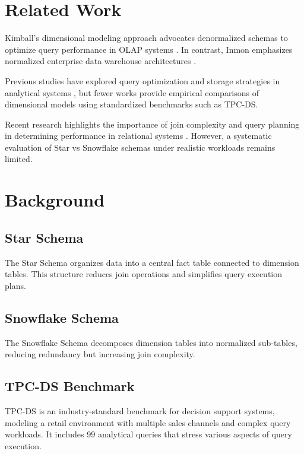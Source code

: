 \documentclass[conference]{IEEEtran}
\begin{document}
\section{Related Work}

Kimball's dimensional modeling approach advocates denormalized schemas to optimize query performance in OLAP systems \cite{kimball}. In contrast, Inmon emphasizes normalized enterprise data warehouse architectures \cite{inmon}.

Previous studies have explored query optimization and storage strategies in analytical systems \cite{abadi}, but fewer works provide empirical comparisons of dimensional models using standardized benchmarks such as TPC-DS.

Recent research highlights the importance of join complexity and query planning in determining performance in relational systems \cite{stonebraker}. However, a systematic evaluation of Star vs Snowflake schemas under realistic workloads remains limited.

\section{Background}

\subsection{Star Schema}

The Star Schema organizes data into a central fact table connected to dimension tables. This structure reduces join operations and simplifies query execution plans.

\subsection{Snowflake Schema}

The Snowflake Schema decomposes dimension tables into normalized sub-tables, reducing redundancy but increasing join complexity.

\subsection{TPC-DS Benchmark}

TPC-DS is an industry-standard benchmark for decision support systems, modeling a retail environment with multiple sales channels and complex query workloads. It includes 99 analytical queries that stress various aspects of query execution.
\end{document}
